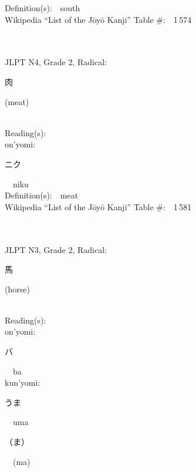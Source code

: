 \begin{multicols}{2}
Definition(s):\ \ south \\
Wikipedia ``List of the J\=oy\=o Kanji'' Table \#:\ \ 1\,574 \\
\ \ \\
{\fontsize{34pt}{40pt}  }\ \ \\  %
{JLPT N4, Grade 2, Radical:\ \ {\begin{CJK}{UTF8}{min} 肉 \end{CJK}} (meat) } \\
Reading(s):\ \ \\
{\hspace*{1em}}on'yomi:\ \ \\
{\hspace*{2em}}{\begin{CJK}{UTF8}{min} ニク \end{CJK}}\ \ niku\ \ \\
Definition(s):\ \ meat \\
Wikipedia ``List of the J\=oy\=o Kanji'' Table \#:\ \ 1\,581 \\
\ \ \\
{\fontsize{34pt}{40pt}  }\ \ \\  %
{JLPT N3, Grade 2, Radical:\ \ {\begin{CJK}{UTF8}{min} 馬 \end{CJK}} (horse) } \\
Reading(s):\ \ \\
{\hspace*{1em}}on'yomi:\ \ \\
{\hspace*{2em}}{\begin{CJK}{UTF8}{min} バ \end{CJK}}\ \ ba\ \ \\
{\hspace*{1em}}kun'yomi:\ \ \\
{\hspace*{2em}}{\begin{CJK}{UTF8}{min} うま \end{CJK}}\ \ uma\ \ \\
{\hspace*{2em}}{\begin{CJK}{UTF8}{min} （ま） \end{CJK}}\ \ (ma)\ \ \\

\end{multicols}
